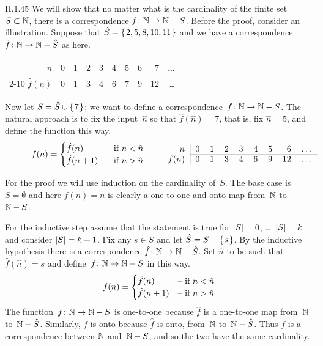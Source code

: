 \begin{ans}{II.1.45}
We will show that no matter what is the cardinality of the finite set
$S\subset\mathbb{N}$, there is a correspondence $\mbox{$f\colon \mathbb{N}\to \mathbb{N}-S$}$.
Before the proof, consider an illustration.
Suppose that $\hat{S}=\set{2,5,8,10,11}$ and we have a correspondence
$\mbox{$\hat{f}\colon \mathbb{N}\to \mathbb{N}-\hat{S}$}$ as here.
\begin{center}
\begin{tabular}{r|*{9}{r}}
  $n$          &$0$ &$1$ &$2$ &$3$ &$4$ &$5$ &$6$ &$7$  &\ldots \\ \cline{2-10}
  $\hat{f}(n)$ &$0$ &$1$ &$3$ &$4$ &$6$ &$7$ &$9$ &$12$ &\ldots
\end{tabular}
\end{center}
Now let $S=\hat{S}\cup\set{7}$; we want to define a
correspondence~$\mbox{$f\colon \mathbb{N}\to \mathbb{N}-S$}$.
The natural approach is to fix the input~$\hat{n}$ so that $\hat{f}(\hat{n})=7$,
that is, fix $\hat{n}=5$, and define the function this way.
\begin{equation*}
  f(n)=
  \begin{cases}
    \hat{f}(n)    &\case{if $n<\hat{n}$}  \\
    \hat{f}(n+1)  &\case{if $n>\hat{n}$}
  \end{cases}
  \qquad
  \begin{minipage}{2in}
  \begin{tabular}{r|*{8}{r}}
    $n$    &$0$ &$1$ &$2$ &$3$ &$4$ &$5$ &$6$  &\ldots  \\ \cline{2-9}
    $f(n)$ &$0$ &$1$ &$3$ &$4$ &$6$ &$9$ &$12$ &\ldots
  \end{tabular}
  \end{minipage}
\end{equation*}

For the proof we will use induction on the cardinality of~$S$.
The base case is~$S=\emptyset$ and here $f(n)=n$ is clearly a one-to-one
and onto map from~$\mathbb{N}$ to~$\mathbb{N}-S$.

For the inductive step assume that the statement is true for
$\lvert S\rvert=0$, \ldots~$\lvert S\rvert=k$ and consider $\lvert S\rvert=k+1$.
Fix any $s\in S$ and let $\hat{S}=S-\set{s}$.
By the inductive hypothesis there is a correspondence
$\mbox{$\hat{f}\colon \mathbb{N}\to \mathbb{N}-\hat{S}$}$.
Set $\hat{n}$ to be such that $\hat{f}(\hat{n})=s$ and
define~$\mbox{$f\colon \mathbb{N}\to \mathbb{N}-S$}$ in this way.
\begin{equation*}
  f(n)=
  \begin{cases}
    \hat{f}(n)    &\text{-- if $n<\hat{n}$}  \\
    \hat{f}(n+1)  &\text{-- if $n>\hat{n}$}
  \end{cases}
\end{equation*}
The  function~$\mbox{$f\colon \mathbb{N}\to \mathbb{N}-S$}$ is one-to-one
because $\hat{f}$ is a one-to-one map from~$\mathbb{N}$ to~$\mathbb{N}-\hat{S}$.
Similarly, $f$ is onto because $\hat{f}$ is onto, from~$\mathbb{N}$ to~$\mathbb{N}-\hat{S}$.
Thus $f$ is a correspondence between $\mathbb{N}$ and~$\mathbb{N}-S$, and so the two have the
same cardinality.
\end{ans}
